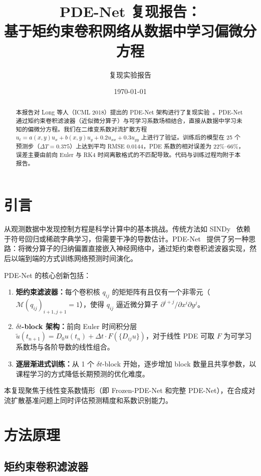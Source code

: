 \documentclass[11pt,a4paper]{article}
\title{\textbf{PDE-Net 复现报告：\\基于矩约束卷积网络从数据中学习偏微分方程}}
\author{复现实验报告}
\date{\today}
\begin{document}
\maketitle

\begin{abstract}
本报告对 Long 等人（ICML 2018）提出的 PDE-Net 架构进行了复现实验~\cite{long2018pdenet}。PDE-Net 通过矩约束卷积滤波器（近似微分算子）与可学习系数场相结合，直接从数据中学习未知的偏微分方程。我们在二维变系数对流扩散方程 $u_t = a(x,y)u_x + b(x,y)u_y + 0.2u_{xx} + 0.3u_{yy}$ 上进行了验证。训练后的模型在 25 个预测步（$\Delta T = 0.375$）上达到平均 RMSE 0.0144，PDE 系数的相对误差为 22\%--66\%，误差主要由前向 Euler 与 RK4 时间离散格式的不匹配导致。代码与训练过程均附于本报告。
\end{abstract}

\section{引言}

从观测数据中发现控制方程是科学计算中的基本挑战。传统方法如 SINDy~\cite{brunton2016discovering} 依赖于符号回归或稀疏字典学习，但需要干净的导数估计。PDE-Net~\cite{long2018pdenet} 提供了另一种思路：将微分算子的归纳偏置直接嵌入神经网络中，通过矩约束卷积滤波器实现，然后以端到端的方式训练网络预测时间演化。

PDE-Net 的核心创新包括：
\begin{enumerate}
    \item \textbf{矩约束滤波器：}每个卷积核 $q_{ij}$ 的矩矩阵有且仅有一个非零元（$\mathcal{M}(q_{ij})_{i+1,j+1}=1$），使得 $q_{ij}$ 逼近微分算子 $\partial^{i+j}/\partial x^i\partial y^j$。
    \item \textbf{$\delta t$-block 架构：}前向 Euler 时间积分层 $\tilde{u}(t_{n+1}) = D_0 u(t_n) + \Delta t \cdot F(\{D_{ij}u\})$，对于线性 PDE 可取 $F$ 为可学习系数场与各阶导数的线性组合。
    \item \textbf{逐层渐进式训练：}从 1 个 $\delta t$-block 开始，逐步增加 block 数量且共享参数，以课程学习的方式降低长期预测的优化难度。
\end{enumerate}

本复现聚焦于线性变系数情形（即 Frozen-PDE-Net 和完整 PDE-Net），在合成对流扩散基准问题上同时评估预测精度和系数识别能力。

\section{方法原理}

\subsection{矩约束卷积滤波器}
\end{document}
